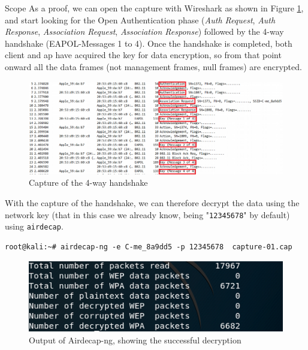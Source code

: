 \begin{chaptercover}{Scope}
As a proof, we can open the capture with Wireshark as shown in Figure \ref{fig:traffic-analysis-wpa-handshake}, and start looking for the Open Authentication phase (\textit{Auth Request}, \textit{Auth Response}, \textit{Association Request}, \textit{Association Response}) followed by the 4-way handshake (EAPOL-Messages 1 to 4). Once the handshake is completed, both client and \acrshort{ap} have acquired the key for data encryption, so from that point onward all the data frames (not management frames, null frames) are encrypted.

\begin{figure}[H]
  \centering
  \includegraphics[width=\linewidth]{figures/traffic-analysis-wpa-handshake}
  \caption{Capture of the 4-way handshake}
  \label{fig:traffic-analysis-wpa-handshake}
\end{figure}

With the capture of the handshake, we can therefore decrypt the data using the network key (that in this case we already know, being "\texttt{12345678}" by default) using \texttt{airdecap}.

\begin{center}
\begin{minipage}{.75\linewidth}
\begin{lstlisting}
root@kali:~# airdecap-ng -e C-me_8a9dd5 -p 12345678  capture-01.cap
\end{lstlisting}
\end{minipage}
\end{center}

\vspace{-1cm}
\begin{figure}[H]
  \centering
  \includegraphics[width=.5\linewidth]{figures/traffic-analysis-airdecap-ng}
  \caption{Output of Airdecap-ng, showing the successful decryption}
  \label{fig:traffic-analysis-airdecap-ng}
\end{figure}


\end{chaptercover}

